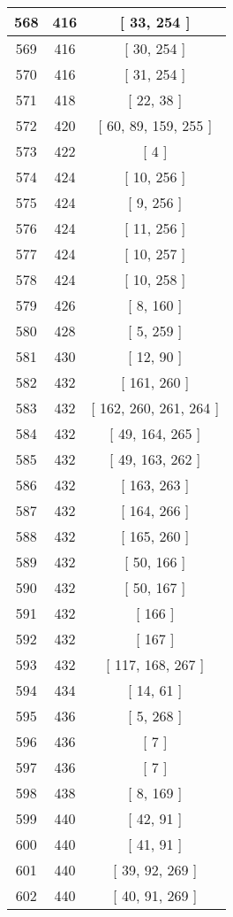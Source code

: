 \begin{center}
\begin{longtable}[H]{|| c c c ||}
\hline
568 & 416 & [ 33, 254 ] \\ 
\hline
569 & 416 & [ 30, 254 ] \\ 
\hline
570 & 416 & [ 31, 254 ] \\ 
\hline
571 & 418 & [ 22, 38 ] \\ 
\hline
572 & 420 & [ 60, 89, 159, 255 ] \\ 
\hline
573 & 422 & [ 4 ] \\ 
\hline
574 & 424 & [ 10, 256 ] \\ 
\hline
575 & 424 & [ 9, 256 ] \\ 
\hline
576 & 424 & [ 11, 256 ] \\ 
\hline
577 & 424 & [ 10, 257 ] \\ 
\hline
578 & 424 & [ 10, 258 ] \\ 
\hline
579 & 426 & [ 8, 160 ] \\ 
\hline
580 & 428 & [ 5, 259 ] \\ 
\hline
581 & 430 & [ 12, 90 ] \\ 
\hline
582 & 432 & [ 161, 260 ] \\ 
\hline
583 & 432 & [ 162, 260, 261, 264 ] \\ 
\hline
584 & 432 & [ 49, 164, 265 ] \\ 
\hline
585 & 432 & [ 49, 163, 262 ] \\ 
\hline
586 & 432 & [ 163, 263 ] \\ 
\hline
587 & 432 & [ 164, 266 ] \\ 
\hline
588 & 432 & [ 165, 260 ] \\ 
\hline
589 & 432 & [ 50, 166 ] \\ 
\hline
590 & 432 & [ 50, 167 ] \\ 
\hline
591 & 432 & [ 166 ] \\ 
\hline
592 & 432 & [ 167 ] \\ 
\hline
593 & 432 & [ 117, 168, 267 ] \\ 
\hline
594 & 434 & [ 14, 61 ] \\ 
\hline
595 & 436 & [ 5, 268 ] \\ 
\hline
596 & 436 & [ 7 ] \\ 
\hline
597 & 436 & [ 7 ] \\ 
\hline
598 & 438 & [ 8, 169 ] \\ 
\hline
599 & 440 & [ 42, 91 ] \\ 
\hline
600 & 440 & [ 41, 91 ] \\ 
\hline
601 & 440 & [ 39, 92, 269 ] \\ 
\hline
602 & 440 & [ 40, 91, 269 ] \\ 

\end{longtable}
\end{center}
